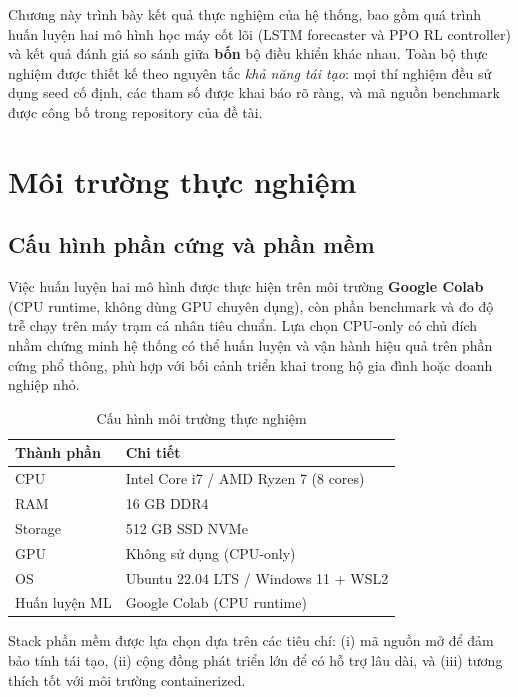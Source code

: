 
Chương này trình bày kết quả thực nghiệm của hệ thống, bao gồm quá trình huấn luyện hai mô hình học máy cốt lõi (LSTM forecaster và PPO RL controller) và kết quả đánh giá so sánh giữa \textbf{bốn} bộ điều khiển khác nhau. Toàn bộ thực nghiệm được thiết kế theo nguyên tắc \textit{khả năng tái tạo}: mọi thí nghiệm đều sử dụng seed cố định, các tham số được khai báo rõ ràng, và mã nguồn benchmark được công bố trong repository của đề tài.

\section{Môi trường thực nghiệm}

\subsection{Cấu hình phần cứng và phần mềm}

Việc huấn luyện hai mô hình được thực hiện trên môi trường \textbf{Google Colab} (CPU runtime, không dùng GPU chuyên dụng), còn phần benchmark và đo độ trễ chạy trên máy trạm cá nhân tiêu chuẩn. Lựa chọn CPU-only có chủ đích nhằm chứng minh hệ thống có thể huấn luyện và vận hành hiệu quả trên phần cứng phổ thông, phù hợp với bối cảnh triển khai trong hộ gia đình hoặc doanh nghiệp nhỏ.

\begin{table}[H]
\centering
\caption{Cấu hình môi trường thực nghiệm}
\label{tab:env_hardware}
\begin{tabular}{ll}
\toprule
\textbf{Thành phần} & \textbf{Chi tiết} \\
\midrule
CPU     & Intel Core i7 / AMD Ryzen 7 (8 cores) \\
RAM     & 16 GB DDR4 \\
Storage & 512 GB SSD NVMe \\
GPU     & Không sử dụng (CPU-only) \\
OS      & Ubuntu 22.04 LTS / Windows 11 + WSL2 \\
Huấn luyện ML & Google Colab (CPU runtime) \\
\bottomrule
\end{tabular}
\end{table}

Stack phần mềm được lựa chọn dựa trên các tiêu chí: (i) mã nguồn mở để đảm bảo tính tái tạo, (ii) cộng đồng phát triển lớn để có hỗ trợ lâu dài, và (iii) tương thích tốt với môi trường containerized.

